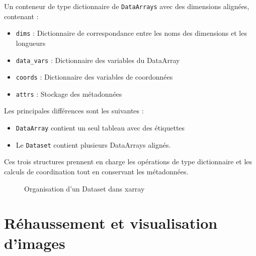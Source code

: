 \documentclass[
  11pt,
  letterpaper,
  open=any,
  twoside=false,
  french]{scrbook}
\begin{document}
Un conteneur de type dictionnaire de \texttt{DataArrays} avec des
dimensions alignées, contenant :

\begin{itemize}
\item
  \texttt{dims} : Dictionnaire de correspondance entre les noms des
  dimensions et les longueurs
\item
  \texttt{data\_vars} : Dictionnaire des variables du DataArray
\item
  \texttt{coords} : Dictionnaire des variables de coordonnées
\item
  \texttt{attrs} : Stockage des métadonnées
\end{itemize}

Les principales différences sont les suivantes :

\begin{itemize}
\item
  \texttt{DataArray} contient un seul tableau avec des étiquettes
\item
  Le \texttt{Dataset} contient plusieurs DataArrays alignés.
\end{itemize}

Ces trois structures prennent en charge les opérations de type
dictionnaire et les calculs de coordination tout en conservant les
métadonnées.

\begin{figure}


\caption{\label{fig-xarray}Organisation d'un Dataset dans xarray}

\end{figure}%


\chapter{Réhaussement et visualisation d'images}\label{sec-chap02}
\end{document}

